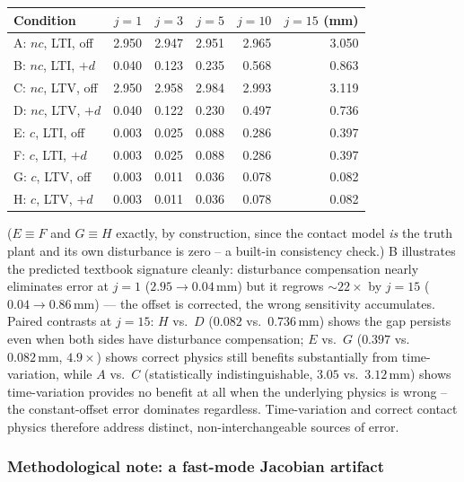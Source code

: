 \documentclass[journal]{IEEEtran}
\begin{document}
\begin{center}
\begin{tabular}{@{}lrrrrr@{}}
\toprule
Condition & $j{=}1$ & $j{=}3$ & $j{=}5$ & $j{=}10$ & $j{=}15$ (mm) \\
\midrule
A: $nc$, LTI, off & 2.950 & 2.947 & 2.951 & 2.965 & 3.050 \\
B: $nc$, LTI, $+d$ & 0.040 & 0.123 & 0.235 & 0.568 & 0.863 \\
C: $nc$, LTV, off & 2.950 & 2.958 & 2.984 & 2.993 & 3.119 \\
D: $nc$, LTV, $+d$ & 0.040 & 0.122 & 0.230 & 0.497 & 0.736 \\
E: $c$, LTI, off & 0.003 & 0.025 & 0.088 & 0.286 & 0.397 \\
F: $c$, LTI, $+d$ & 0.003 & 0.025 & 0.088 & 0.286 & 0.397 \\
G: $c$, LTV, off & 0.003 & 0.011 & 0.036 & 0.078 & 0.082 \\
H: $c$, LTV, $+d$ & 0.003 & 0.011 & 0.036 & 0.078 & 0.082 \\
\bottomrule
\end{tabular}
\end{center}

($E{\equiv}F$ and $G{\equiv}H$ exactly, by construction, since the
contact model \emph{is} the truth plant and its own disturbance is
zero -- a built-in consistency check.) B illustrates the predicted
textbook signature cleanly: disturbance compensation nearly eliminates
error at $j=1$ ($2.95\to0.04\,\mathrm{mm}$) but it regrows
$\sim\!22\times$ by $j=15$ ($0.04\to0.86\,\mathrm{mm}$) --- the offset
is corrected, the wrong sensitivity accumulates. Paired contrasts at
$j=15$: $H$ vs.\ $D$ ($0.082$ vs.\ $0.736\,\mathrm{mm}$) shows the gap
persists even when both sides have disturbance compensation; $E$ vs.\
$G$ ($0.397$ vs.\ $0.082\,\mathrm{mm}$, $4.9\times$) shows correct
physics still benefits substantially from time-variation, while $A$
vs.\ $C$ (statistically indistinguishable, $3.05$ vs.\
$3.12\,\mathrm{mm}$) shows time-variation provides no benefit at all
when the underlying physics is wrong -- the constant-offset error
dominates regardless. Time-variation and correct contact physics
therefore address distinct, non-interchangeable sources of error.

\subsubsection{Methodological note: a fast-mode Jacobian artifact}
\label{sec:mn-methods-note}
\end{document}
